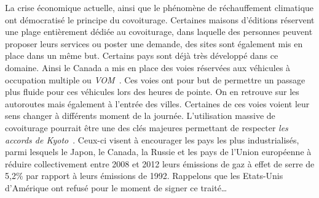 \documentclass[12pt, a4paper, oneside]{article}
\begin{document}
    \indent La crise économique actuelle, ainsi que le phénomène de réchauffement climatique ont démocratisé le principe du covoiturage. Certaines maisons d'éditions réservent une plage entièrement dédiée au covoiturage, dans laquelle des personnes peuvent proposer leurs services ou poster une demande, des sites sont également mis en place dans un même but. Certains pays sont déjà très développé dans ce domaine. Ainsi le Canada a mis en place des voies réservées aux véhicules à occupation multiple ou \textit{VOM}~\cite{article-VOM}. Ces voies ont pour but de permettre un passage plus fluide pour ces véhicules lors des heures de pointe. On en retrouve sur les autoroutes mais également à l'entrée des villes. Certaines de ces voies voient leur sens changer à différents moment de la journée. L'utilisation massive de covoiturage pourrait être une des clés majeures permettant de respecter \textit{les accords de Kyoto}~\cite{article-Kyoto}. Ceux-ci visent à encourager les pays les plus industrialisés, parmi lesquels le Japon, le Canada, la Russie et les pays de l'Union européenne à réduire collectivement entre 2008 et 2012 leurs émissions de gaz à effet de serre de 5,2$\%$ par rapport à leurs émissions de 1992. Rappelons que les Etats-Unis d'Amérique ont refusé pour le moment de signer ce traité\dots
    
\end{document}
